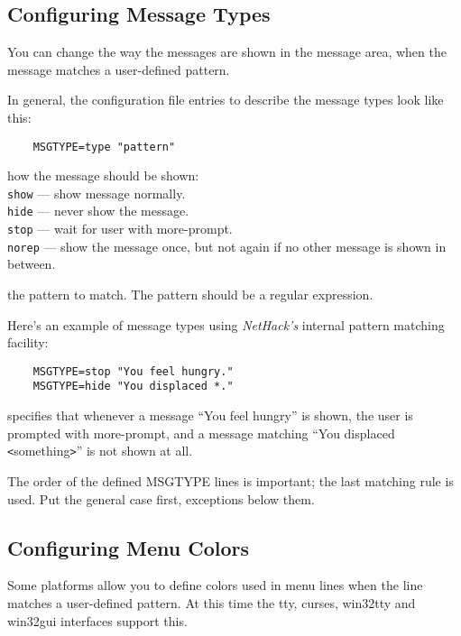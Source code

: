 \subsection*{Configuring Message Types}

You can change the way the messages are shown in the message area, when
the message matches a user-defined pattern.

In general, the configuration file entries to describe the message types
look like this:
\begin{verbatim}
    MSGTYPE=type "pattern"
\end{verbatim}
\blist{}
\item[\ib{type}]
how the message should be shown:
\\
{\tt show}  --- show message normally.\\
{\tt hide}  --- never show the message.\\
{\tt stop}  --- wait for user with more-prompt.\\
{\tt norep} --- show the message once, but not again if no other message is
shown in between.
\item[\ib{pattern}]
the pattern to match. The pattern should be a regular expression.
\elist

Here's an example of message types using {\it NetHack's\/} internal
pattern matching facility:

\begin{verbatim}
    MSGTYPE=stop "You feel hungry."
    MSGTYPE=hide "You displaced *."
\end{verbatim}

specifies that whenever a message ``You feel hungry'' is shown,
the user is prompted with more-prompt, and a message matching
``You displaced  \verb+<+something\verb+>+'' is not shown at all.

The order of the defined MSGTYPE lines is important; the last matching
rule is used. Put the general case first, exceptions below them.


\subsection*{Configuring Menu Colors}

Some platforms allow you to define colors used in menu lines when the
line matches a user-defined pattern.
At this time the tty, curses, win32tty and
win32gui interfaces support this.

